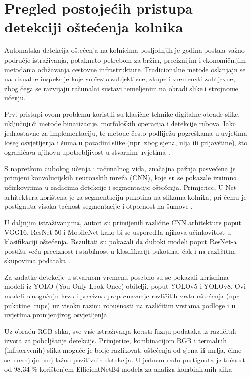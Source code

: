 \documentclass[seminarskirad]{fer}
\begin{document}
\chapter{Pregled postojećih pristupa detekciji oštećenja kolnika}
\label{pog:pregled}

Automatska detekcija oštećenja na kolnicima posljednjih je godina postala važno područje istraživanja, potaknuto potrebom za bržim, preciznijim i ekonomičnijim metodama održavanja cestovne infrastrukture. Tradicionalne metode oslanjaju se na vizualne inspekcije koje su često subjektivne, skupe i vremenski zahtjevne, zbog čega se razvijaju računalni sustavi temeljenim na obradi slike i strojnome učenju.

Prvi pristupi ovom problemu koristili su klasične tehnike digitalne obrade slike, uključujući metode binarizacije, morfoloških operacija i detekcije rubova. Iako jednostavne za implementaciju, te metode često podliježu pogreškama u uvjetima lošeg osvjetljenja i šuma u pozadini slike (npr. zbog sjena, ulja ili prljavštine), što ograničava njihovu upotrebljivost u stvarnim uvjetima \cite{lau2020}.

S napretkom dubokog učenja i računalnog vida, značajna pažnja posvećena je primjeni konvolucijskih neuronskih mreža (CNN), koje su se pokazale iznimno učinkovitima u zadacima detekcije i segmentacije oštećenja. Primjerice, U-Net arhitektura korištena je za segmentaciju pukotina na slikama kolnika, pri čemu je postignuta visoka točnost segmentacije i otpornost na šumove \cite{lau2020}.

U daljnjim istraživanjima, autori su primijenili različite CNN arhitekture poput VGG16, ResNet-50 i MobileNet kako bi se usporedila njihova učinkovitost u klasifikaciji oštećenja. Rezultati su pokazali da duboki modeli poput ResNet-a postižu veću preciznost i stabilnost u klasifikaciji pukotina, čak i na različitim skupovima podataka \cite{tapamo2023}.

Za zadatke detekcije u stvarnom vremenu posebno su se pokazali korisnima modeli iz YOLO (You Only Look Once) obitelji, poput YOLOv5 i YOLOv8. Ovi modeli omogućuju brzo i precizno prepoznavanje različitih vrsta oštećenja (npr. pukotine, rupe) uz visoku razinu robusnosti na različitim vrstama podloge i u uvjetima promjenjivog osvjetljenja \cite{nafaa2024}.

Uz obradu RGB slika, sve više istraživanja koristi fuziju podataka iz različitih izvora za poboljšanje detekcije. Primjerice, kombinacijom RGB i termalnih (infracrvenih) slika moguće je bolje razlikovati oštećenja od sjena ili mrlja, čime se smanjuje broj lažno pozitivnih detekcija. U jednom radu postignuta je točnost od 98,34 \% korištenjem EfficientNetB4 modela za analizu kombiniranih slika \cite{mdpi2022}.
\end{document}
